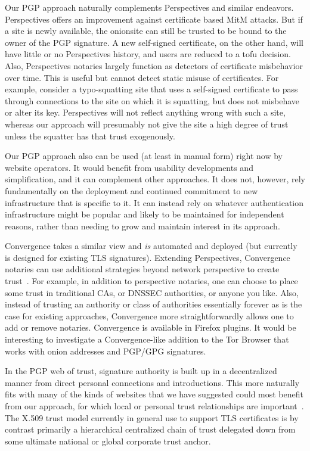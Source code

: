 \documentclass[10pt, conference, compsocconf]{styles/IEEEtran}
\begin{document}
Our PGP approach naturally complements Perspectives and similar
endeavors. Perspectives offers an improvement against
certificate based MitM attacks. But if a site is newly available,
the onionsite can still be trusted to be bound to the owner of
the PGP signature. A new self-signed certificate, on the other hand,
will have little or no
Perspectives history, and users are reduced to a tofu
decision. Also, Perspectives notaries largely function as
detectors of certificate misbehavior over time. This is useful
but cannot detect static misuse of certificates.
For example, consider a typo-squatting site that uses a self-signed
certificate to pass through connections to the site on which it is
squatting, but
does not misbehave or alter its key. Perspectives will not reflect
anything wrong with such a site, whereas our approach will presumably
not give the site a high degree of trust unless the squatter has
that trust exogenously. 

Our PGP approach also can be used (at least in manual form) right now by
website operators. It would benefit from usability developments
and simplification, and it can complement other approaches. It does not,
however,
rely fundamentally on the deployment and continued commitment to new
infrastructure that is specific to it.  It can instead
rely on whatever authentication infrastructure might be popular
and likely to be maintained for independent reasons, rather than
needing to grow and maintain interest in its approach.

Convergence takes a similar view and \emph{is} automated and deployed
(but currently is designed for existing TLS signatures).  Extending
Perspectives, Convergence notaries can use additional strategies
beyond network perspective to create trust~\cite{convergence}. For
example, in addition to perspective notaries, one can choose to place
some trust in traditional CAs, or DNSSEC authorities, or anyone you
like. Also, instead of trusting an authority or class of authorities
essentially forever as is the case for existing approaches,
Convergence more straightforwardly allows one to add or remove
notaries. Convergence is available in Firefox plugins. It would be
interesting to investigate a Convergence-like addition to the Tor
Browser that works with onion addresses and PGP/GPG signatures.

In the PGP web of trust, signature authority is built up in a
decentralized manner from direct personal connections and
introductions. This more naturally fits with many of the kinds of
websites that we have suggested could most benefit from our approach,
for which local or personal trust relationships are
important~\cite{zimmerman}.  The X.509 trust model currently in
general use to support TLS certificates is by contrast primarily a
hierarchical centralized chain of trust delegated down from some
ultimate national or global corporate trust anchor.
\end{document}
